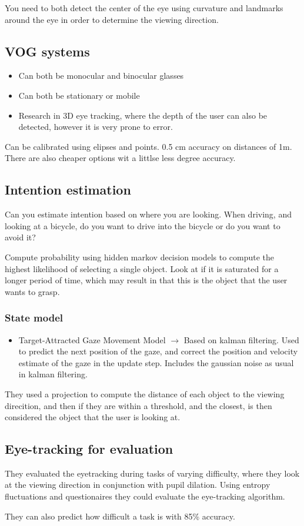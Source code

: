 \documentclass[a4paper]{article}
\begin{document}
You need to both detect the center of the eye using curvature and landmarks around the eye in order to determine the viewing direction.

\subsection{VOG systems}
\begin{itemize}
	\item Can both be monocular and binocular glasses
	\item Can both be stationary or mobile
	\item Research in 3D eye tracking, where the depth of the user can also be detected, however it is very prone to error. 
\end{itemize}

Can be calibrated using elipses and points. 0.5 cm accuracy on distances of 1m.
There are also cheaper options wit a littlse less degree accuracy. 


\subsection{Intention estimation}
Can you estimate intention based on where you are looking. When driving, and looking at a bicycle, do you want to drive into the bicycle or do you want to avoid it?


Compute probability using hidden markov decision models to compute the highest likelihood of selecting a single object. Look at if it is saturated for a longer period of time, which may result in that this is the object that the user wants to grasp. 

\subsubsection{State model}
\begin{itemize}
	\item Target-Attracted Gaze Movement Model $ \rightarrow $ Based on kalman filtering. Used to predict the next position of the gaze, and correct the position and velocity estimate of the gaze in the update step. Includes the gaussian noise as usual in kalman filtering. 
\end{itemize}

They used a projection to compute the distance of each object to the viewing direcition, and then if they are within a threshold, and the closest, is then considered the object that the user is looking at. 

\subsection{Eye-tracking for evaluation}
They evaluated the eyetracking during tasks of varying difficulty, where they look at the viewing direction in conjunction with pupil dilation. Using entropy fluctuations and questionaires they could evaluate the eye-tracking algorithm.

\vspace{5pt}
They can also predict how difficult a task is with 85\% accuracy. 
\end{document}
